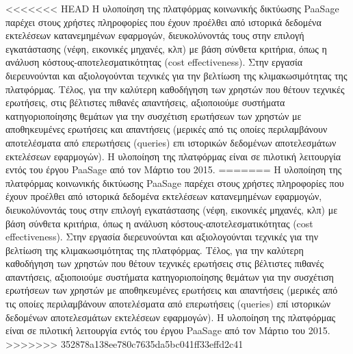 \begin{titlepage}
<<<<<<< HEAD
Η υλοποίηση της πλατφόρμας κοινωνικής δικτύωσης PaaSage παρέχει στους χρήστες πληροφορίες που έχουν προέλθει από ιστορικά δεδομένα εκτελέσεων κατανεμημένων εφαρμογών, διευκολύνοντάς τους στην επιλογή εγκατάστασης (νέφη, εικονικές μηχανές, κλπ) με βάση σύνθετα κριτήρια, όπως η ανάλυση κόστους-αποτελεσματικότητας (cost effectiveness).  Στην εργασία διερευνούνται και αξιολογούνται τεχνικές για την βελτίωση της κλιμακωσιμότητας της πλατφόρμας. Τέλος, για την καλύτερη καθοδήγηση των χρηστών που θέτουν τεχνικές ερωτήσεις, στις βέλτιστες πιθανές απαντήσεις, αξιοποιούμε συστήματα κατηγοριοποίησης θεμάτων για την συσχέτιση ερωτήσεων των χρηστών με αποθηκευμένες ερωτήσεις και απαντήσεις (μερικές από τις οποίες περιλαμβάνουν αποτελέσματα από επερωτήσεις (queries) επι ιστορικών δεδομένων αποτελεσμάτων εκτελέσεων εφαρμογών). Η υλοποίηση της πλατφόρμας είναι σε πιλοτική λειτουργία εντός του έργου PaaSage από τον Μάρτιο του 2015.
=======
Η υλοποίηση της πλατφόρμας κοινωνικής δικτύωσης PaaSage παρέχει στους χρήστες πληροφορίες που έχουν προέλθει από ιστορικά δεδομένα εκτελέσεων κατανεμημένων εφαρμογών, διευκολύνοντάς τους στην επιλογή εγκατάστασης (νέφη, εικονικές μηχανές, κλπ) με βάση σύνθετα κριτήρια, όπως η ανάλυση κόστους-αποτελεσματικότητας (cost effectiveness).  Στην εργασία διερευνούνται και αξιολογούνται τεχνικές για την βελτίωση της κλιμακωσιμότητας της πλατφόρμας. Τέλος, για την καλύτερη καθοδήγηση των χρηστών που θέτουν τεχνικές ερωτήσεις στις βέλτιστες πιθανές απαντήσεις, αξιοποιούμε συστήματα κατηγοριοποίησης θεμάτων για την συσχέτιση ερωτήσεων των χρηστών με αποθηκευμένες ερωτήσεις και απαντήσεις (μερικές από τις οποίες περιλαμβάνουν αποτελέσματα από επερωτήσεις (queries) επί ιστορικών δεδομένων αποτελεσμάτων εκτελέσεων εφαρμογών). Η υλοποίηση της πλατφόρμας είναι σε πιλοτική λειτουργία εντός του έργου PaaSage από τον Μάρτιο του 2015.
>>>>>>> 352878a138ee780c7635da5bc041ff33effd2c41



\vfill

\end{titlepage}

